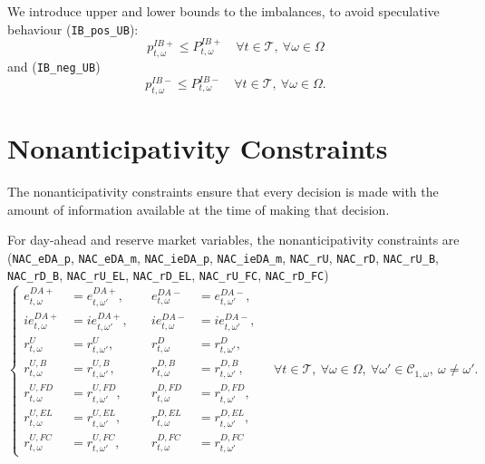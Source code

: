 \documentclass{article}
\begin{document}
We introduce upper and lower bounds to the imbalances, to avoid speculative behaviour (\verb|IB_pos_UB|):
\begin{equation} \label{EQ:VPP_IB_MAX}
	p_{t, \omega}^{IB+} \leq P_{t, \omega}^{IB+} \quad \forall t \in \mathcal{T}, \ \forall \omega \in \Omega
\end{equation}
and (\verb|IB_neg_UB|)
\begin{equation} \label{EQ:VPP_IB_MIN}
	p_{t, \omega}^{IB-} \leq P_{t, \omega}^{IB-} \quad \forall t \in \mathcal{T}, \ \forall \omega \in \Omega.
\end{equation}



\section{Nonanticipativity Constraints}
\label{SEC:NonanticipativityConstraints}

The nonanticipativity constraints ensure that every decision is made with the
amount of information available at the time of making that decision.

For day-ahead and reserve market variables, the nonanticipativity constraints
are (\verb|NAC_eDA_p|, \verb|NAC_eDA_m|, \verb|NAC_ieDA_p|, \verb|NAC_ieDA_m|,
\verb|NAC_rU|, \verb|NAC_rD|, \verb|NAC_rU_B|, \verb|NAC_rD_B|,
\verb|NAC_rU_EL|, \verb|NAC_rD_EL|, \verb|NAC_rU_FC|, \verb|NAC_rD_FC|)
\begin{equation}
\left\{
\begin{aligned}
  e^{DA+}_{t,\omega}   &= e^{DA+}_{t,\omega'}, &\quad
  e^{DA-}_{t,\omega}   &= e^{DA-}_{t,\omega'}, \\
  ie^{DA+}_{t,\omega}  &= ie^{DA+}_{t,\omega'}, &\quad
  ie^{DA-}_{t,\omega}  &= ie^{DA-}_{t,\omega'}, \\
  r^{U}_{t,\omega}     &= r^{U}_{t,\omega'},    &\quad
  r^{D}_{t,\omega}     &= r^{D}_{t,\omega'},    \\
  r^{U,B}_{t,\omega}   &= r^{U,B}_{t,\omega'},  &\quad
  r^{D,B}_{t,\omega}   &= r^{D,B}_{t,\omega'},  \\
  r^{U,FD}_{t,\omega}  &= r^{U,FD}_{t,\omega'}, &\quad
  r^{D,FD}_{t,\omega}  &= r^{D,FD}_{t,\omega'}, \\
  r^{U,EL}_{t,\omega}  &= r^{U,EL}_{t,\omega'}, &\quad
  r^{D,EL}_{t,\omega}  &= r^{D,EL}_{t,\omega'}, \\
  r^{U,FC}_{t,\omega}  &= r^{U,FC}_{t,\omega'}, &\quad
  r^{D,FC}_{t,\omega}  &= r^{D,FC}_{t,\omega'}
\end{aligned}
\right.
\quad \forall t \in \mathcal{T},\ \forall \omega \in \Omega,\
\forall \omega' \in \mathcal{C}_{1, \omega},\ \omega \neq \omega'.
\label{EQ:NAC_DM_RM}
\end{equation}
\end{document}
